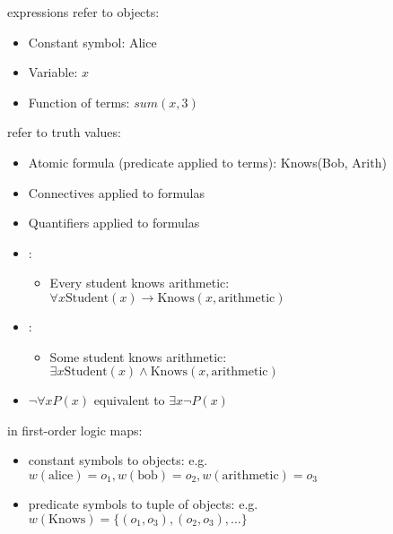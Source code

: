  expressions refer to objects:
\begin{itemize}
    \item Constant symbol: Alice
    \item Variable: $x$
    \item Function of terms: $sum(x, 3)$
\end{itemize}

 refer to truth values:
\begin{itemize}
    \item Atomic formula (predicate applied to terms): Knows(Bob, Arith)
    \item Connectives applied to formulas
    \item Quantifiers applied to formulas
\end{itemize}

\begin{itemize}
    \item {}: \begin{itemize}
        \item Every student knows arithmetic: $\forall x \text{Student}(x) \rightarrow \text{Knows}(x, \text{arithmetic})$
    \end{itemize}
    \item {}: \begin{itemize}
        \item Some student knows arithmetic: $\exists x \text{Student}(x) \wedge \text{Knows}(x, \text{arithmetic})$
    \end{itemize}
    \item $\neg \forall x P(x)$ equivalent to $\exists x \neg P(x)$
\end{itemize}

 in first-order logic maps:
\begin{itemize}
    \item constant symbols to objects: e.g. $w(\text{alice}) = o_1, w(\text{bob}) = o_2, w(\text{arithmetic}) = o_3$
    \item predicate symbols to tuple of objects: e.g. $w(\text{Knows}) = \{(o_1, o_3), (o_2, o_3), \dots\}$
\end{itemize}

